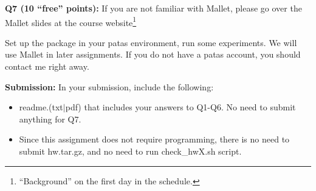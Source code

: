 \documentclass[11pt]{article}
\begin{document}
\vspace{0.3 in}
\hspace{-0.3in}
{\bf Q7 (10 ``free'' points):}
    If you are not familiar with Mallet, please go over the Mallet slides
    at the course website\footnote{``Background'' on the first day in the schedule.}
    
    Set up the package in your patas 
    environment, run some experiments. We will use Mallet in later
    assignments.  If you do not have a patas account, you should contact
    me right away.



\newpage
\hspace{-0.3in}
{\bf Submission:} In your submission, include the following:
\begin{itemize}
  \item readme.(txt$\mid$pdf) that includes your answers to Q1-Q6. 
    No need to submit anything for Q7.
    
  \item Since this assignment does not require programming,
      there is no need to submit hw.tar.gz,
      and no need to run check\_hwX.sh script.
   
\end{itemize}
\end{document}
